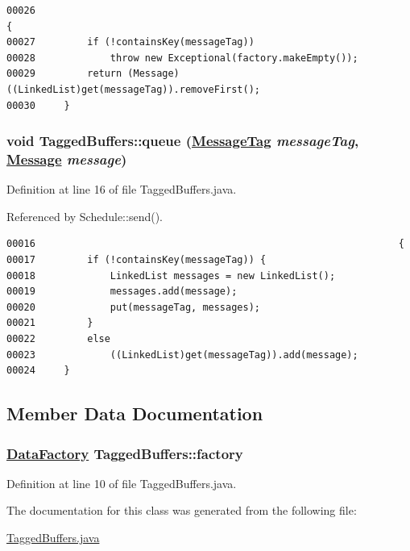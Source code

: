 \footnotesize\begin{verbatim}00026                                                                      {
00027         if (!containsKey(messageTag))
00028             throw new Exceptional(factory.makeEmpty());
00029         return (Message)((LinkedList)get(messageTag)).removeFirst();
00030     }
\end{verbatim}\normalsize 
\hypertarget{classTaggedBuffers_a1}{
\subsubsection[queue]{\setlength{\rightskip}{0pt plus 5cm}void Tagged\-Buffers::queue (\hyperlink{interfaceMessageTag}{Message\-Tag} {\em message\-Tag}, \hyperlink{interfaceMessage}{Message} {\em message})}}
\label{classTaggedBuffers_a1}




Definition at line 16 of file Tagged\-Buffers.java.

Referenced by Schedule::send().

\footnotesize\begin{verbatim}00016                                                               {
00017         if (!containsKey(messageTag)) {
00018             LinkedList messages = new LinkedList();
00019             messages.add(message);
00020             put(messageTag, messages);
00021         }
00022         else 
00023             ((LinkedList)get(messageTag)).add(message);
00024     }
\end{verbatim}\normalsize 


\subsection{Member Data Documentation}
\hypertarget{classTaggedBuffers_o0}{
\subsubsection[factory]{\setlength{\rightskip}{0pt plus 5cm}\hyperlink{interfaceDataFactory}{Data\-Factory} Tagged\-Buffers::factory}}
\label{classTaggedBuffers_o0}




Definition at line 10 of file Tagged\-Buffers.java.

The documentation for this class was generated from the following file:\begin{CompactItemize}
\item 
\hyperlink{TaggedBuffers_8java-source}{Tagged\-Buffers.java}\end{CompactItemize}
